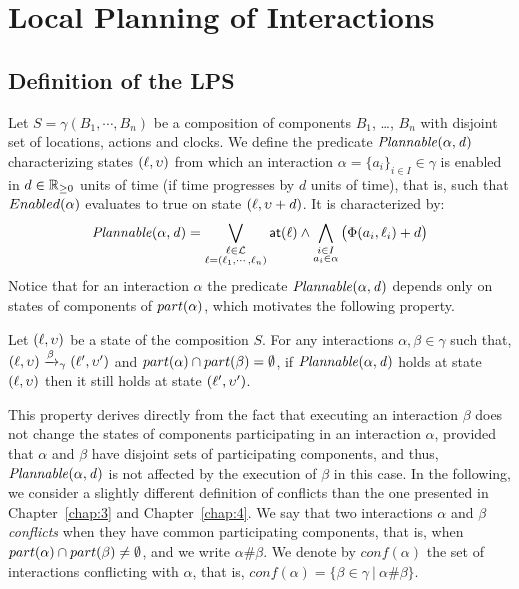 \section{Local Planning of Interactions}
\subsection{Definition of the LPS}
\label{subsec:wp} 
Let $S=\gamma(B_1,\cdots,B_n)$ be a composition of components $B_1$, \ldots, $B_n$ with
disjoint set of locations, actions and clocks.
We define the predicate $\mathit{Plannable(\alpha,d)}$ characterizing states $(\ell, \upsilon)$
from which an interaction $\alpha = \{ a_i \}_{i \in I} \in \gamma$ is enabled in 
$d \in \mathbb{R}_{\ge 0}$ units of time (if time progresses by $d$ units of time),
that is, such that $Enabled(\alpha)$ evaluates to true on state $(\ell, \upsilon + d)$.
It is characterized by:
\begin{equation}\label{eq:enf1}
\mathit{Plannable(\alpha,d)} = \bigvee_{\substack{\ell\in\mathcal{L}\\\ell=(\ell_1,\cdots,\ell_n)}}
  \textsf{at}(\ell)\wedge\bigwedge_{\substack{i\in I\\a_i\in\alpha}}\big(\Phi(a_i,\ell_i) + d\big)
\end{equation}
Notice that for an interaction $\alpha$ the predicate $\mathit{Plannable(\alpha,d)}$ depends only 
on states of components of $part(\alpha)$, which motivates the following property.

\begin{property}\label{pt:plnIn1}
Let $(\ell,\upsilon)$ be a state of the composition $S$. For any interactions $\alpha,\beta\in\gamma$
such that, $(\ell,\upsilon)\xrightarrow{\beta}_{\gamma}(\ell',\upsilon')$ and $part(\alpha)\cap part(\beta)=
\emptyset$, if $\mathit{Plannable(\alpha,d)}$ holds at state $(\ell,\upsilon)$ then it still 
holds at state $(\ell',\upsilon')$.
\end{property}
This property derives directly from the fact that executing an interaction $\beta$ does 
not change the states of components participating in an interaction $\alpha$, 
provided that $\alpha$ and $\beta$ have disjoint sets of participating components, 
and thus, $\mathit{Plannable(\alpha,d)}$ is not affected by the execution of $\beta$ in this case.
In the following, we consider a slightly different definition of conflicts than the one
presented in Chapter~\ref{chap:3} and Chapter~\ref{chap:4}. 
We say that two interactions $\alpha$ and $\beta$ \emph{conflicts} when 
they have common participating components, that is, when $part(\alpha)\cap part(\beta)\neq\emptyset$, 
and we write $\alpha\#\beta$.
We denote by $conf(\alpha)$ the set of interactions conflicting with $\alpha$, that is, 
$conf(\alpha) = \{ \beta \in \gamma \ | \ \alpha\#\beta \}$.


